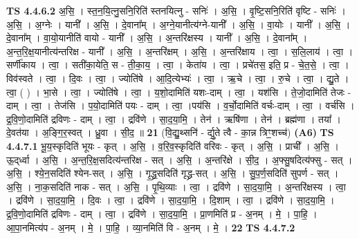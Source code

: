 \documentclass[17pt]{extarticle}
\begin{document}
                  \newline
                                \textbf{ TS 4.4.6.2} \newline
                  अ॒सि॒ । स्त॒न॒यि॒त्नु॒सनि॒रिति॑ स्तनयित्नु - सनिः॑ । अ॒सि॒ । वृ॒ष्टि॒सनि॒रिति॑ वृष्टि - सनिः॑ । अ॒सि॒ । अ॒ग्नेः । यानी᳚ । अ॒सि॒ । दे॒वाना᳚म् । अ॒ग्ने॒यानीत्य॑ग्ने-यानी᳚ । अ॒सि॒ । वा॒योः । यानी᳚ । अ॒सि॒ । दे॒वाना᳚म् । वा॒यो॒यानीति॑ वायो - यानी᳚ । अ॒सि॒ । अ॒न्तरि॑क्षस्य । यानी᳚ । अ॒सि॒ । दे॒वाना᳚म् । अ॒न्त॒रि॒क्ष॒यानीत्य॑न्तरिक्ष - यानी᳚ । अ॒सि॒ । अ॒न्तरि॑क्षम् । अ॒सि॒ । अ॒न्तरि॑क्षाय । त्वा॒ । स॒लि॒लाय॑ । त्वा॒ । सर्णी॑काय । त्वा॒ । सती॑का॒येति॒ स - ती॒का॒य॒ । त्वा॒ । केता॑य । त्वा॒ । प्रचे॑तस॒ इति॒ प्र - चे॒त॒से॒ । त्वा॒ । विव॑स्वते । त्वा॒ । दि॒वः । त्वा॒ । ज्योति॑षे । आ॒दि॒त्येभ्यः॑ । त्वा॒ । ऋ॒चे । त्वा॒ । रु॒चे । त्वा॒ । द्यु॒ते । त्वा॒ ( ) । भा॒से । त्वा॒ । ज्योति॑षे । त्वा॒ । य॒शो॒दामिति॑ यशः-दाम् । त्वा॒ । यश॑सि । ते॒जो॒दामिति॑ तेजः - दाम् । त्वा॒ । तेज॑सि । प॒यो॒दामिति॑ पयः - दाम् । त्वा॒ ।पय॑सि । व॒र्चो॒दामिति॑ वर्चः-दाम् । त्वा॒ । वर्च॑सि । द्र॒वि॒णो॒दामिति॑ द्रविणः - दाम् । त्वा॒ । द्रवि॑णे । सा॒द॒या॒मि॒ । तेन॑ । ऋषि॑णा । तेन॑ । ब्रह्म॑णा । तया᳚ । दे॒वत॑या । अ॒ङ्गि॒र॒स्वत् । ध्रु॒वा । सी॒द॒ ॥ \textbf{  21} \newline
                  \newline
                      (वि॒द्यु॒थ्सनि॑ - र्द्यु॒ते त्वै - का॒न्न त्रिꣳ॒॒शच्च॑)  \textbf{(A6)} \newline \newline
                                \textbf{ TS 4.4.7.1} \newline
                  भू॒य॒स्कृदिति॑ भूयः - कृत् । अ॒सि॒ । व॒रि॒व॒स्कृदिति॑ वरिवः - कृत् । अ॒सि॒ । प्राची᳚ । अ॒सि॒ । ऊ॒द्‌र्ध्वा । अ॒सि॒ । अ॒न्त॒रि॒क्ष॒सदित्य॑न्तरिक्ष - सत् । अ॒सि॒ । अ॒न्तरि॑क्षे । सी॒द॒ । अ॒फ्सु॒षदित्य॑फ्सु - सत् । अ॒सि॒ । श्ये॒न॒सदिति॑ श्येन-सत् । अ॒सि॒ । गृ॒द्ध्र॒सदिति॑ गृद्ध्र-सत् । अ॒सि॒ । सु॒प॒र्ण॒सदिति॑ सुपर्ण - सत् । अ॒सि॒ । ना॒क॒सदिति॑ नाक - सत् । अ॒सि॒ । पृ॒थि॒व्याः । त्वा॒ । द्रवि॑णे । सा॒द॒या॒मि॒ । अ॒न्तरि॑क्षस्य । त्वा॒ । द्रवि॑णे । सा॒द॒या॒मि॒ । दि॒वः । त्वा॒ । द्रवि॑णे । सा॒द॒या॒मि॒ । दि॒शाम् । त्वा॒ । द्रवि॑णे । सा॒द॒या॒मि॒ । द्र॒वि॒णो॒दामिति॑ द्रविणः - दाम् । त्वा॒ । द्रवि॑णे । सा॒द॒या॒मि॒ । प्रा॒णमिति॑ प्र - अ॒नम् । मे॒ । पा॒हि॒ । आ॒पा॒नमित्य॑प - अ॒नम् । मे॒ । पा॒हि॒ । व्या॒नमिति॑ वि - अ॒नम् । मे॒ । \textbf{  22} \newline
                  \newline
                                \textbf{ TS 4.4.7.2} \newline
\end{document}

